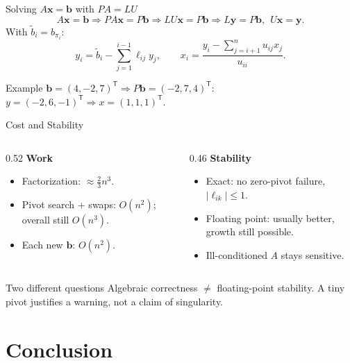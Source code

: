 \documentclass[11pt,aspectratio=169]{beamer}
\begin{document}
\begin{frame}{Solving $A\mathbf{x}=\mathbf{b}$ with $PA=LU$}
  \[
    A\mathbf{x}=\mathbf{b}\Rightarrow PA\mathbf{x}=P\mathbf{b}\Rightarrow LU\mathbf{x}=P\mathbf{b}
    \Rightarrow \boxed{L\mathbf{y}=P\mathbf{b},\ \ U\mathbf{x}=\mathbf{y}.}
  \]
  With $\widetilde b_i=b_{\pi_i}$:
  \[
    y_i=\widetilde b_i-\sum_{j=1}^{i-1}\ell_{ij}y_j,\qquad
    x_i=\frac{y_i-\sum_{j=i+1}^{n}u_{ij}x_j}{u_{ii}}.
  \]
  \begin{exampleblock}{Example}
    $\mathbf b=(4,-2,7)^{\mathsf T}\Rightarrow P\mathbf b=(-2,7,4)^{\mathsf T}$:
    $y=(-2,6,-1)^{\mathsf T}\Rightarrow x=(1,1,1)^{\mathsf T}$.
  \end{exampleblock}
\end{frame}

\begin{frame}{Cost and Stability}
  \begin{columns}[T]
    \begin{column}{0.52\textwidth}
      \textbf{Work}
      \begin{itemize}
        \item Factorization: $\approx\tfrac23 n^3$.
        \item Pivot search + swaps: $O(n^2)$; overall still $O(n^3)$.
        \item Each new $\mathbf{b}$: $O(n^2)$.
      \end{itemize}
    \end{column}
    \begin{column}{0.46\textwidth}
      \textbf{Stability}
      \begin{itemize}
        \item Exact: no zero-pivot failure, $|\ell_{ik}|\le1$.
        \item Floating point: usually better, growth still possible.
        \item Ill-conditioned $A$ stays sensitive.
      \end{itemize}
    \end{column}
  \end{columns}
  \begin{alertblock}{Two different questions}
    Algebraic correctness $\neq$ floating-point stability. A tiny pivot justifies a
    warning, not a claim of singularity.
  \end{alertblock}
\end{frame}

\section{Conclusion}
\end{document}
